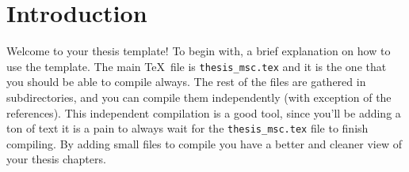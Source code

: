\documentclass[../main/thesis_msc.tex]{subfiles}
\begin{document}
    \chapter{Introduction}

    Welcome to your thesis template! To begin with, a brief explanation on how to use the template. The main \TeX\, file is \texttt{thesis\_msc.tex} and it is the one that you should be able to compile always. The rest of the files are gathered in subdirectories, and you can compile them independently (with exception of the references). This independent compilation is a good tool, since you'll be adding a ton of text it is a pain to always wait for the \texttt{thesis\_msc.tex} file to finish compiling. By adding small files to compile you have a better and cleaner view of your thesis chapters.
\end{document}
